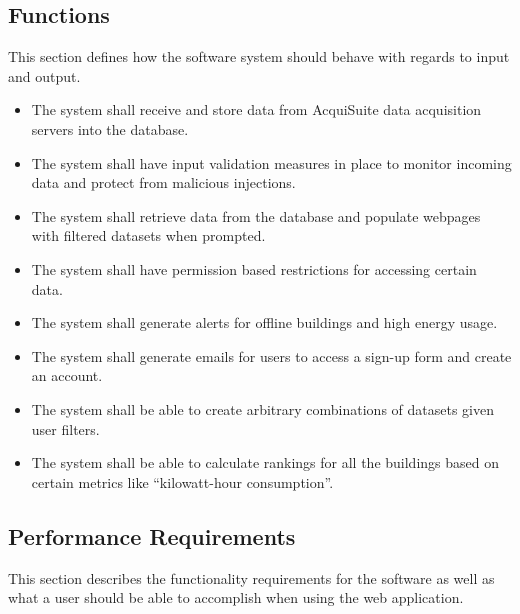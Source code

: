 \documentclass[onecolumn, draftclsnofoot,10pt, compsoc]{IEEEtran}
\begin{document}
    \subsection{Functions}
    This section defines how the software system should behave with regards to input and output.
    \begin{itemize}
    \item The system shall receive and store data from AcquiSuite data acquisition servers into the database. 
    \item The system shall have input validation measures in place to monitor incoming data and protect from malicious injections.
    \item The system shall retrieve data from the database and populate webpages with filtered datasets when prompted.
    \item The system shall have permission based restrictions for accessing certain data.
    \item The system shall generate alerts for offline buildings and high energy usage.
    \item The system shall generate emails for users to access a sign-up form and create an account.
    \item The system shall be able to create arbitrary combinations of datasets given user filters.
    \item The system shall be able to calculate rankings for all the buildings based on certain metrics like ``kilowatt-hour consumption''.
    \end{itemize}

    \subsection{Performance Requirements}
    This section describes the functionality requirements for the software as well as what a user should be able to accomplish when using the web application.
\end{document}
